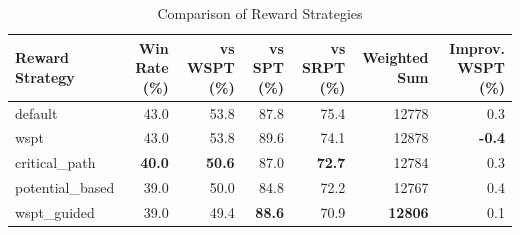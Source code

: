 \begin{table}[htbp]%
\centering%
\begin{tabular}{lrrrrrr}%
\toprule%
\textbf{Reward Strategy}&\textbf{Win Rate (\%)}&\textbf{vs WSPT (\%)}&\textbf{vs SPT (\%)}&\textbf{vs SRPT (\%)}&\textbf{Weighted Sum}&\textbf{Improv. WSPT (\%)}\\%
\midrule%
default&43.0&53.8&87.8&75.4&12778&0.3\\%
wspt&43.0&53.8&89.6&74.1&12878&\textbf{-0.4}\\%
critical_path&\textbf{40.0}&\textbf{50.6}&87.0&\textbf{72.7}&12784&0.3\\%
potential_based&39.0&50.0&84.8&72.2&12767&0.4\\%
wspt_guided&39.0&49.4&\textbf{88.6}&70.9&\textbf{12806}&0.1\\%
\bottomrule%
\end{tabular}%
\caption{Comparison of Reward Strategies}%
\label{tab:rewards}%
\end{table}